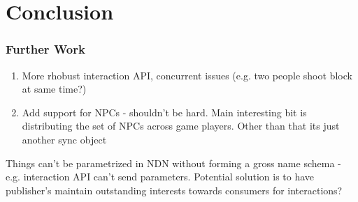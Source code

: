 \chapter{Conclusion}

\subsection{Further Work}
\begin{enumerate}
    \item More rhobust interaction API, concurrent issues (e.g. two people shoot block at same time?)
    \item Add support for NPCs - shouldn't be hard. Main interesting bit is distributing the set of NPCs across game players. Other than that its just another sync object
\end{enumerate}


Things can't be parametrized in NDN without forming a gross name schema - e.g. interaction API can't send parameters. Potential solution is to have publisher's maintain outstanding interests towards consumers for interactions?